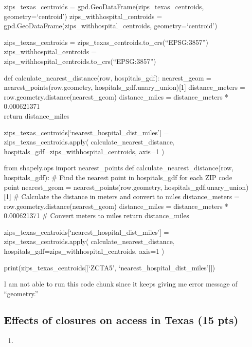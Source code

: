 \documentclass[
  letterpaper,
  DIV=11,
  numbers=noendperiod]{scrartcl}
\providecommand{\tightlist}{%
  \setlength{\itemsep}{0pt}\setlength{\parskip}{0pt}}\usepackage{longtable,booktabs,array}
\begin{document}
zips\_texas\_centroids = gpd.GeoDataFrame(zips\_texas\_centroids,
geometry=`centroid') zips\_withhospital\_centroids =
gpd.GeoDataFrame(zips\_withhospital\_centroids, geometry=`centroid')

zips\_texas\_centroids = zips\_texas\_centroids.to\_crs(``EPSG:3857'')
zips\_withhospital\_centroids =
zips\_withhospital\_centroids.to\_crs(``EPSG:3857'')

def calculate\_nearest\_distance(row, hospitals\_gdf): nearest\_geom =
nearest\_points(row.geometry, hospitals\_gdf.unary\_union){[}1{]}
distance\_meters = row.geometry.distance(nearest\_geom) distance\_miles
= distance\_meters * 0.000621371\\
return distance\_miles

zips\_texas\_centroids{[}`nearest\_hospital\_dist\_miles'{]} =
zips\_texas\_centroids.apply( calculate\_nearest\_distance,
hospitals\_gdf=zips\_withhospital\_centroids, axis=1 )

from shapely.ops import nearest\_points def
calculate\_nearest\_distance(row, hospitals\_gdf): \# Find the nearest
point in hospitals\_gdf for each ZIP code point nearest\_geom =
nearest\_points(row.geometry, hospitals\_gdf.unary\_union){[}1{]} \#
Calculate the distance in meters and convert to miles distance\_meters =
row.geometry.distance(nearest\_geom) distance\_miles = distance\_meters
* 0.000621371 \# Convert meters to miles return distance\_miles

zips\_texas\_centroids{[}`nearest\_hospital\_dist\_miles'{]} =
zips\_texas\_centroids.apply( calculate\_nearest\_distance,
hospitals\_gdf=zips\_withhospital\_centroids, axis=1 )

print(zips\_texas\_centroids{[}{[}`ZCTA5',
`nearest\_hospital\_dist\_miles'{]}{]})

I am not able to run this code chunk since it keeps giving me error
message of ``geometry.''

\subsection{Effects of closures on access in Texas (15
pts)}\label{effects-of-closures-on-access-in-texas-15-pts}

\begin{enumerate}
\def\labelenumi{\arabic{enumi}.}
\tightlist
\item
\end{enumerate}
\end{document}

